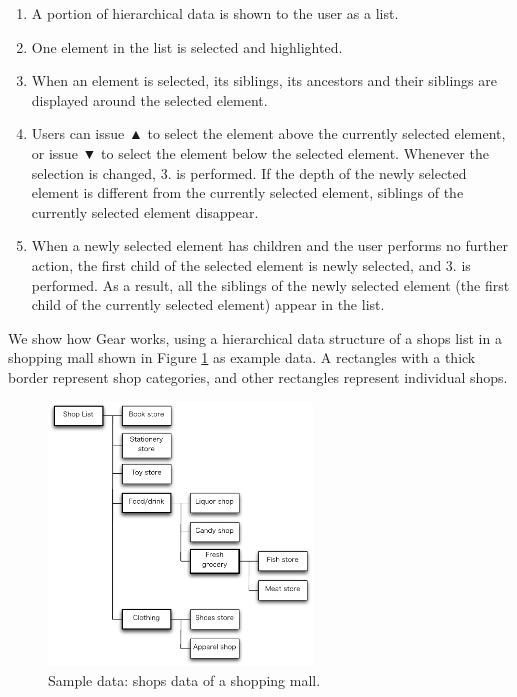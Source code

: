 \documentclass[conference]{IEEEtran}
\def\up{▲}
\def\down{▼}
\begin{document}
\begin{enumerate}
\item A portion of hierarchical data is shown to the user as a list.

\item One element in the list is selected and highlighted.


\item When an element is selected, its siblings, its ancestors and their siblings are displayed
around the selected element.

\item Users can issue {\up} to select the element above the currently selected element,
or issue {\down} to select the element below the selected element.
Whenever the selection is changed, 3. is performed.
If the depth of the newly selected element is different from the currently
selected element, siblings of the currently selected element disappear.

\item When a newly selected element has children and the user performs no further action,
the first child of the selected element is newly selected, and 3. is performed.
As a result, all the siblings of the newly selected element
(the first child of the currently selected element) appear in the list.

\end{enumerate}

We show how Gear works, using a hierarchical data structure of
a shops list in a shopping mall shown in Figure \ref{fig1} as example data.
A rectangles with a thick border represent shop categories, and
other rectangles represent individual shops.

\begin{figure}[H]
\centerline{\includegraphics[width=70mm,bb=0 0 490 490]{figures/fig1.pdf}}
\caption{Sample data: shops data of a shopping mall.}
\label{fig1}
\end{figure}
\end{document}
